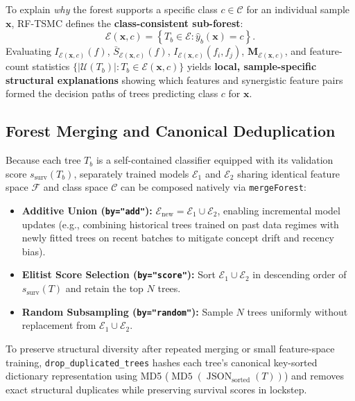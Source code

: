 \documentclass[11pt,a4paper]{article}
\newcommand{\code}[1]{\texttt{#1}}
\DeclareMathOperator{\MDfive}{MD5}
\DeclareMathOperator{\JSON}{JSON}
\begin{document}
To explain \emph{why} the forest supports a specific class $c \in \mathcal{C}$ for an individual sample $\mathbf{x}$, RF-TSMC defines the \textbf{class-consistent sub-forest}:
\begin{equation}
  \mathcal{E}(\mathbf{x}, c) = \left\{ T_b \in \mathcal{E} : \hat{y}_{b}(\mathbf{x}) = c \right\}.
\end{equation}
Evaluating $I_{\mathcal{E}(\mathbf{x}, c)}(f)$, $\bar{S}_{\mathcal{E}(\mathbf{x}, c)}(f)$, $I_{\mathcal{E}(\mathbf{x}, c)}(f_i, f_j)$, $\mathbf{M}_{\mathcal{E}(\mathbf{x}, c)}$, and feature-count statistics $\{|\mathcal{U}(T_b)| : T_b \in \mathcal{E}(\mathbf{x}, c)\}$ yields \textbf{local, sample-specific structural explanations} showing which features and synergistic feature pairs formed the decision paths of trees predicting class $c$ for $\mathbf{x}$.

\subsection{Forest Merging and Canonical Deduplication}
\label{sec:merge}

Because each tree $T_b$ is a self-contained classifier equipped with its validation score $s_{\text{surv}}(T_b)$, separately trained models $\mathcal{E}_1$ and $\mathcal{E}_2$ sharing identical feature space $\mathcal{F}$ and class space $\mathcal{C}$ can be composed natively via \code{mergeForest}:
\begin{itemize}[leftmargin=*, itemsep=3pt]
  \item \textbf{Additive Union (\code{by="add"}):} $\mathcal{E}_{\text{new}} = \mathcal{E}_1 \cup \mathcal{E}_2$, enabling incremental model updates (e.g., combining historical trees trained on past data regimes with newly fitted trees on recent batches to mitigate concept drift and recency bias).
  \item \textbf{Elitist Score Selection (\code{by="score"}):} Sort $\mathcal{E}_1 \cup \mathcal{E}_2$ in descending order of $s_{\text{surv}}(T)$ and retain the top $N$ trees.
  \item \textbf{Random Subsampling (\code{by="random"}):} Sample $N$ trees uniformly without replacement from $\mathcal{E}_1 \cup \mathcal{E}_2$.
\end{itemize}
To preserve structural diversity after repeated merging or small feature-space training, \code{drop\_\allowbreak duplicated\_\allowbreak trees} hashes each tree's canonical key-sorted dictionary representation using MD5 ($\MDfive(\JSON_{\text{sorted}}(T))$) and removes exact structural duplicates while preserving survival scores in lockstep.
\end{document}
